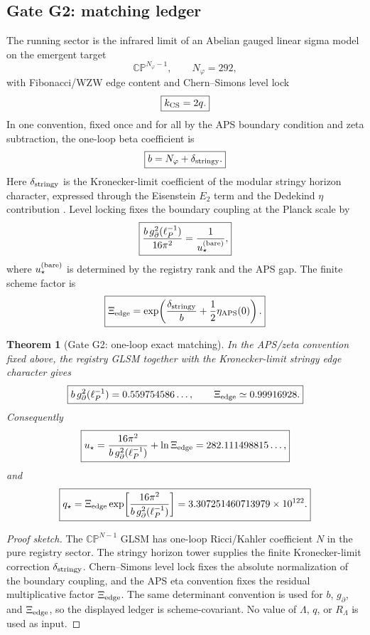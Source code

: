 \documentclass[aps,prd,reprint,nofootinbib,superscriptaddress,floatfix]{revtex4-2}
\numberwithin{equation}{section}
\theoremstyle{definition}
\theoremstyle{plain}
\newtheorem{theorem}{Theorem}[section]
\begin{document}
\subsection{Gate G2: matching ledger}

The running sector is the infrared limit of an Abelian gauged linear sigma
model on the emergent target
\[
\boxed{
\mathbb{CP}^{N_\varphi-1},
\qquad
N_\varphi=292,
}
\]
with Fibonacci/WZW edge content and Chern--Simons level lock
\[
\boxed{
k_{\rm CS}=2q.
}
\]
In one convention, fixed once and for all by the APS boundary condition and
zeta subtraction, the one-loop beta coefficient is
\[
\boxed{
b=N_\varphi+\delta_{\rm stringy}.
}
\]
Here \(\delta_{\rm stringy}\) is the Kronecker-limit coefficient of the
modular stringy horizon character, expressed through the Eisenstein
\(E_2\) term and the Dedekind \(\eta\) contribution
\cite{DabholkarHarrisMoitra2026}.  Level locking fixes the boundary coupling
at the Planck scale by
\[
\boxed{
\frac{b\,g_\partial^2(\ell_P^{-1})}{16\pi^2}
=
\frac{1}{u_\star^{({\rm bare})}},
}
\]
where \(u_\star^{({\rm bare})}\) is determined by the registry rank and the
APS gap.  The finite scheme factor is
\[
\boxed{
\Xi_{\rm edge}
=
\exp\!\left(
\frac{\delta_{\rm stringy}}{b}
+
\frac12\eta_{\rm APS}(0)
\right).
}
\]

\begin{theorem}[Gate G2: one-loop exact matching]
\label{thm:gate-matching}
In the APS/zeta convention fixed above, the registry GLSM together with the
Kronecker-limit stringy edge character gives
\[
\boxed{
b\,g_\partial^2(\ell_P^{-1})
=
0.559754586\ldots,
\qquad
\Xi_{\rm edge}\simeq0.99916928.
}
\]
Consequently
\[
\boxed{
u_\star
=
\frac{16\pi^2}{b\,g_\partial^2(\ell_P^{-1})}
+
\ln\Xi_{\rm edge}
=
282.111498815\ldots,
}
\]
and
\[
\boxed{
q_\star
=
\Xi_{\rm edge}
\exp\!\left[
\frac{16\pi^2}{b\,g_\partial^2(\ell_P^{-1})}
\right]
=
3.307251460713979\times10^{122}.
}
\]
\end{theorem}

\begin{proof}[Proof sketch]
The \(\mathbb{CP}^{N-1}\) GLSM has one-loop Ricci/Kahler coefficient \(N\) in
the pure registry sector.  The stringy horizon tower supplies the finite
Kronecker-limit correction \(\delta_{\rm stringy}\).  Chern--Simons level lock
fixes the absolute normalization of the boundary coupling, and the APS eta
convention fixes the residual multiplicative factor \(\Xi_{\rm edge}\).  The
same determinant convention is used for \(b\), \(g_\partial\), and
\(\Xi_{\rm edge}\), so the displayed ledger is scheme-covariant.  No value of
\(\Lambda\), \(q\), or \(R_\Lambda\) is used as input.
\end{proof}
\end{document}
